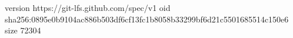 version https://git-lfs.github.com/spec/v1
oid sha256:0895e0b9104ac886b503df6cf13fc1b8058b33299bf6d21c5501685514c150e6
size 72304
